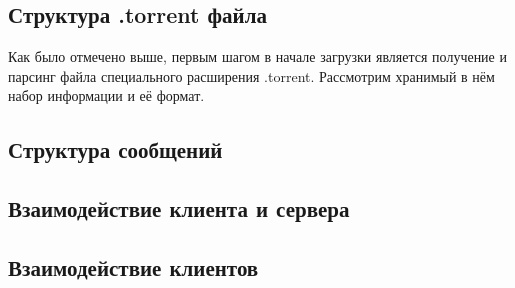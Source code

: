 \subsection{Структура .torrent файла}
Как было отмечено выше, первым шагом в начале загрузки является получение и парсинг файла специального расширения .torrent. Рассмотрим хранимый в нём набор информации и её формат.

\subsection{Структура сообщений}

\subsection{Взаимодействие клиента и сервера}

\subsection{Взаимодействие клиентов}
